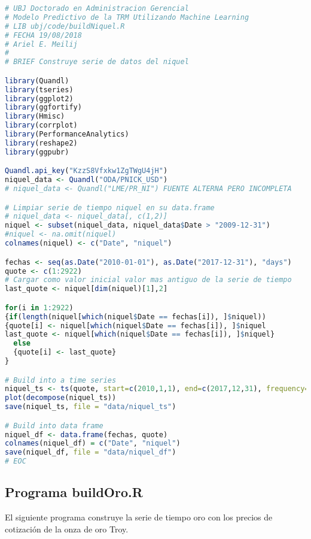 \begin{lstlisting}[language=R]
# UBJ Doctorado en Administracion Gerencial
# Modelo Predictivo de la TRM Utilizando Machine Learning
# LIB ubj/code/buildNiquel.R 
# FECHA 19/08/2018
# Ariel E. Meilij
#
# BRIEF Construye serie de datos del niquel

library(Quandl)
library(tseries)
library(ggplot2)
library(ggfortify)
library(Hmisc)
library(corrplot)
library(PerformanceAnalytics)
library(reshape2)
library(ggpubr)

Quandl.api_key("KzzS8Vfxkw1ZgTWgU4jH")
niquel_data <- Quandl("ODA/PNICK_USD")
# niquel_data <- Quandl("LME/PR_NI") FUENTE ALTERNA PERO INCOMPLETA

# Limpiar serie de tiempo niquel en su data.frame
# niquel_data <- niquel_data[, c(1,2)]
niquel <- subset(niquel_data, niquel_data$Date > "2009-12-31")
#niquel <- na.omit(niquel)
colnames(niquel) <- c("Date", "niquel")

fechas <- seq(as.Date("2010-01-01"), as.Date("2017-12-31"), "days")
quote <- c(1:2922)
# Cargar como valor inicial valor mas antiguo de la serie de tiempo
last_quote <- niquel[dim(niquel)[1],2]

for(i in 1:2922)
{if(length(niquel[which(niquel$Date == fechas[i]), ]$niquel))
{quote[i] <- niquel[which(niquel$Date == fechas[i]), ]$niquel
last_quote <- niquel[which(niquel$Date == fechas[i]), ]$niquel}
  else
  {quote[i] <- last_quote}
}

# Build into a time series
niquel_ts <- ts(quote, start=c(2010,1,1), end=c(2017,12,31), frequency=365)
plot(decompose(niquel_ts))
save(niquel_ts, file = "data/niquel_ts")

# Build into data frame
niquel_df <- data.frame(fechas, quote)
colnames(niquel_df) = c("Date", "niquel")
save(niquel_df, file = "data/niquel_df")
# EOC
\end{lstlisting}

\subsection{Programa buildOro.R}
El siguiente programa construye la serie de tiempo oro con los precios de cotización de la onza de oro Troy.

